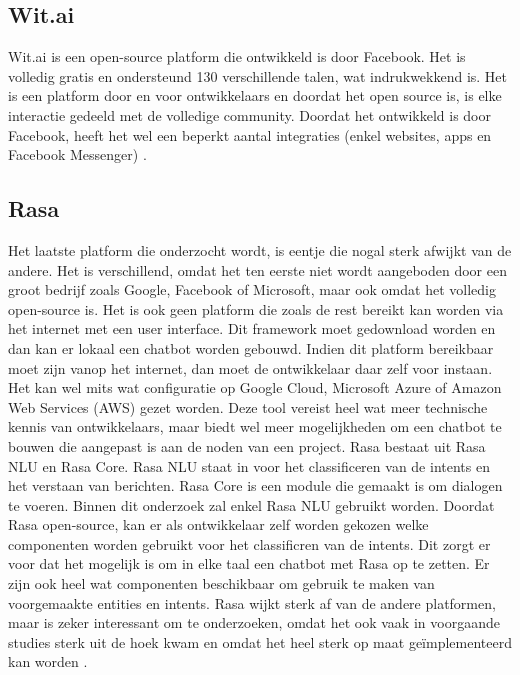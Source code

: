 \subsection{Wit.ai}
\label{subsec:nlp-platformen-wit.ai}

Wit.ai is een open-source platform die ontwikkeld is door Facebook. Het is volledig gratis en ondersteund 130 verschillende talen, wat indrukwekkend is. Het is een platform door en voor ontwikkelaars en doordat het open source is, is elke interactie gedeeld met de volledige community. Doordat het ontwikkeld is door Facebook, heeft het wel een beperkt aantal integraties (enkel websites, apps en Facebook Messenger) \autocite{Wit2020}.

\subsection{Rasa}
\label{subsec:nlp-platformen-rasa}

Het laatste platform die onderzocht wordt, is eentje die nogal sterk afwijkt van de andere. Het is verschillend, omdat het ten eerste niet wordt aangeboden door een groot bedrijf zoals Google, Facebook of Microsoft, maar ook omdat het volledig open-source is. Het is ook geen platform die zoals de rest bereikt kan worden via het internet met een user interface. Dit framework moet gedownload worden en dan kan er lokaal een chatbot worden gebouwd. Indien dit platform bereikbaar moet zijn vanop het internet, dan moet de ontwikkelaar daar zelf voor instaan. Het kan wel mits wat configuratie op Google Cloud, Microsoft Azure of Amazon Web Services (AWS) gezet worden. Deze tool vereist heel wat meer technische kennis van ontwikkelaars, maar biedt wel meer mogelijkheden om een chatbot te bouwen die aangepast is aan de noden van een project. Rasa bestaat uit Rasa NLU en Rasa Core.  Rasa NLU staat in voor het classificeren van de intents en het verstaan van berichten. Rasa Core is een module die gemaakt is om dialogen te voeren. Binnen dit onderzoek zal enkel Rasa NLU gebruikt worden. Doordat Rasa open-source, kan er als ontwikkelaar zelf worden gekozen welke componenten worden gebruikt voor het classificren van de intents. Dit zorgt er voor dat het mogelijk is om in elke taal een chatbot met Rasa op te zetten. Er zijn ook heel wat componenten beschikbaar om gebruik te maken van voorgemaakte entities en intents. Rasa wijkt sterk af van de andere platformen, maar is zeker interessant om te onderzoeken, omdat het ook vaak in voorgaande studies sterk uit de hoek kwam en omdat het heel sterk op maat geïmplementeerd kan worden \autocite{RASA2020}.

